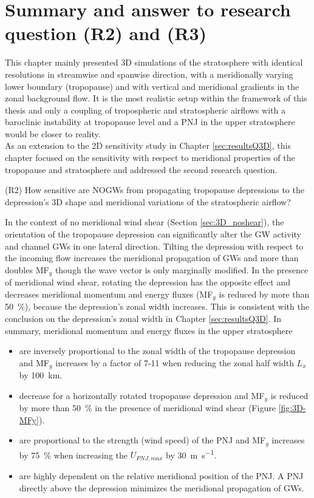 %
\section{Summary and answer to research question (R2) and (R3)}
\label{sec:3D_summary}
This chapter mainly presented 3D simulations of the stratosphere with identical resolutions in streamwise and spanwise direction, with a meridionally varying lower boundary (tropopause) and with vertical and meridional gradients in the zonal background flow. It is the most realistic setup within the framework of this thesis and only a coupling of tropospheric and stratospheric airflows with a baroclinic instability at tropopause level and a PNJ in the upper stratosphere would be closer to reality. \\
As an extension to the 2D sensitivity study in Chapter \ref{sec:resultsQ3D}, this chapter focused on the sensitivity with respect to meridional properties of the tropopause and stratosphere and addressed the second research question.
\begin{tcolorbox}[]
    (R2) How sensitive are NOGWs from propagating tropopause depressions to the depression's 3D shape and meridional variations of the stratospheric airflow?
\end{tcolorbox}
In the context of no meridional wind shear (Section \ref{sec:3D_noshear}), the orientation of the tropopause depression can significantly alter the GW activity and channel GWs in one lateral direction. Tilting the depression with respect to the incoming flow increases the meridional propagation of GWs and more than doubles MF$_y$ though the wave vector is only marginally modified. In the presence of meridional wind shear, rotating the depression has the opposite effect and decreases meridional momentum and energy fluxes (MF$_y$ is reduced by more than \SI{50}{\percent}), because the depression's zonal width increases. This is consistent with the conclusion on the depression's zonal width in Chapter \ref{sec:resultsQ3D}. In summary, meridional momentum and energy fluxes in the upper stratosphere
\begin{itemize}
    \item are inversely proportional to the zonal width of the tropopause depression and MF$_y$ increases by a factor of 7-11 when reducing the zonal half width $L_x$ by \SI{100}{\kilo\meter}.
    \item decrease for a horizontally rotated tropopause depression and MF$_y$ is reduced by more than \SI{50}{\percent} in the presence of meridional wind shear (Figure \ref{fig:3D-MFy}).
    \item are proportional to the strength (wind speed) of the PNJ and MF$_y$ increases by \SI{75}{\percent} when increasing the $U_{PNJ,max}$ by \SI{30}{\meter\per\second}.
    \item are highly dependent on the relative meridional position of the PNJ. A PNJ directly above the depression minimizes the meridional propagation of GWs.
\end{itemize}
